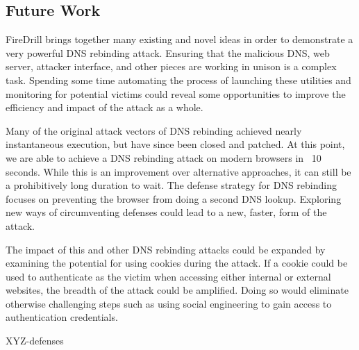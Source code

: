 \subsection{Future Work}

FireDrill brings together many existing and novel ideas in order to demonstrate a very powerful DNS rebinding attack. Ensuring that the malicious DNS, web server, attacker interface, and other pieces are working in unison is a complex task. Spending some time automating the process of launching these utilities and monitoring for potential victims could reveal some opportunities to improve the efficiency and impact of the attack as a whole.

Many of the original attack vectors of DNS rebinding achieved nearly instantaneous execution, but have since been closed and patched. At this point, we are able to achieve a DNS rebinding attack on modern browsers in ~10 seconds. While this is an improvement over alternative approaches, it can still be a prohibitively long duration to wait.  The defense strategy for DNS rebinding focuses on preventing the browser from doing a second DNS lookup. Exploring new ways of circumventing defenses could lead to a new, faster, form of the attack.

The impact of this and other DNS rebinding attacks could be expanded by examining the potential for using cookies during the attack. If a cookie could be used to authenticate as the victim when accessing either internal or external websites, the breadth of the attack could be amplified. Doing so would eliminate otherwise challenging steps such as using social engineering to gain access to authentication credentials.

XYZ-defenses




